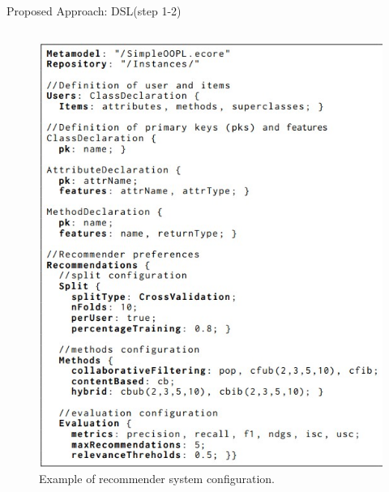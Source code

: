 \documentclass{beamer}
\begin{document}
\begin{frame}{Proposed Approach: DSL(step 1-2)}
\begin{columns}
\begin{figure}[tpb]
            \includegraphics[width=0.9\linewidth]{pic/DSL.jpg}
            \caption{ Example of recommender system configuration.}
            \label{DSL}
        \end{figure}
    \end{columns}
\end{frame}
\end{document}
